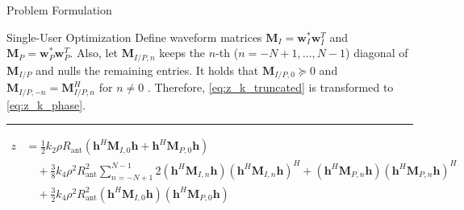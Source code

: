 \documentclass{IEEEtran}
\begin{document}
\begin{section}{Problem Formulation}
\begin{subsection}{Single-User Optimization}
		Define waveform matrices $\boldsymbol{M}_I=\boldsymbol{w}_I^*\boldsymbol{w}_I^T$ and $\boldsymbol{M}_P=\boldsymbol{w}_P^*\boldsymbol{w}_P^T$. Also, let $\boldsymbol{M}_{I/P, n}$ keeps the $n$-th ($n=-N+1,\dots,N-1$) diagonal of $\boldsymbol{M}_{I/P}$ and nulls the remaining entries. It holds that $\boldsymbol{M}_{I/P,0} \succeq 0$ and $\boldsymbol{M}_{I/P,-n}=\boldsymbol{M}_{I/P,n}^H$ for $n{\ne}0$ \cite{Huang2017}. Therefore, \ref{eq:z_k_truncated} is transformed to \ref{eq:z_k_phase}.
		\begin{figure*}[b]
			\hrule
			\begin{equation}\label{eq:z_k_phase}
				\begin{split}
					z
					&=\frac{1}{2}{k_2}{\rho}{R_{\text{ant}}}(\boldsymbol{h}^H\boldsymbol{M}_{I,0}\boldsymbol{h}+\boldsymbol{h}^H\boldsymbol{M}_{P,0}\boldsymbol{h})\\
					&\quad+\frac{3}{8}{k_4}{\rho^2}{R_{\text{ant}}^2}\sum_{n=-N+1}^{N-1}{2(\boldsymbol{h}^H\boldsymbol{M}_{I,n}\boldsymbol{h})(\boldsymbol{h}^H\boldsymbol{M}_{I,n}\boldsymbol{h})^H+(\boldsymbol{h}^H\boldsymbol{M}_{P,n}\boldsymbol{h})(\boldsymbol{h}^H\boldsymbol{M}_{P,n}\boldsymbol{h})^H}\\
					&\quad+\frac{3}{2}{k_4}{\rho^2}{R_{\text{ant}}^2}{(\boldsymbol{h}^H\boldsymbol{M}_{I,0}\boldsymbol{h})(\boldsymbol{h}^H\boldsymbol{M}_{P,0}\boldsymbol{h})}
				\end{split}
			\end{equation}
		\end{figure*}


\end{subsection}
\end{section}
\end{document}
